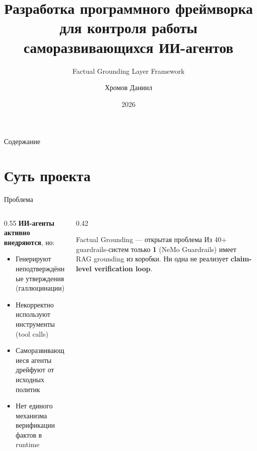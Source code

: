 \documentclass[aspectratio=169, 12pt]{beamer}
\title{Разработка программного фреймворка для контроля работы саморазвивающихся ИИ-агентов}
\subtitle{Factual Grounding Layer Framework}
\author{Хромов Даниил}
\institute{ФКН НИУ ВШЭ}
\date{2026}
\begin{document}
\begin{frame}[plain]
  \titlepage
\end{frame}

\begin{frame}{Содержание}
  \tableofcontents
\end{frame}

\section{Суть проекта}

\begin{frame}{Проблема}
  \begin{columns}[T]
    \begin{column}{0.55\textwidth}
      \textbf{ИИ-агенты активно внедряются}, но:
      \begin{itemize}
        \item Генерируют \textcolor{warnred}{неподтверждённые утверждения} (галлюцинации)
        \item Некорректно используют \textcolor{warnred}{инструменты} (tool calls)
        \item Саморазвивающиеся агенты \textcolor{warnred}{дрейфуют} от исходных политик
        \item Нет единого механизма \textcolor{warnred}{верификации} фактов в runtime
      \end{itemize}
    \end{column}
    \begin{column}{0.42\textwidth}
      \begin{block}{Factual Grounding --- открытая проблема}
        Из 40+ guardrails-систем только \textbf{1} (NeMo Guardrails) имеет RAG grounding из коробки. Ни одна не реализует \textbf{claim-level verification loop}.
      \end{block}
    \end{column}
  \end{columns}
\end{frame}
\end{document}
